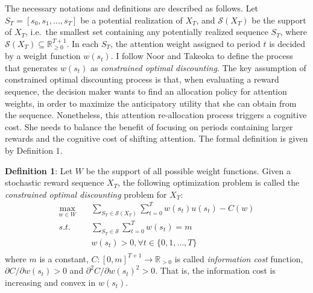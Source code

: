 \documentclass[
  12pt,
]{article}
\begin{document}
The necessary notations and definitions are described as follows. Let
\(S_T=[s_0,s_1,...,s_T]\) be a potential realization of \(X_T\), and
\(\mathcal{S}(X_T)\) be the support of \(X_T\), i.e.~the smallest set
containing any potentially realized sequence \(S_T\), where
\(\mathcal{S}(X_T)\subseteq \mathbb{R}_{\geq 0}^{T+1}\). In each
\(S_T\), the attention weight assigned to period \(t\) is decided by a
weight function \(w(s_t)\). I follow Noor and Takeoka
\citetext{\citeyear{noor_optimal_2022}; \citeyear{noor_constrained_2023}}
to define the process that generates \(w(s_t)\) as \emph{constrained
optimal discounting}. The key assumption of constrained optimal
discounting process is that, when evaluating a reward sequence, the
decision maker wants to find an allocation policy for attention weights,
in order to maximize the anticipatory utility that she can obtain from
the sequence. Nonetheless, this attention re-allocation process triggers
a cognitive cost. She needs to balance the benefit of focusing on
periods containing larger rewards and the cognitive cost of shifting
attention. The formal definition is given by Definition 1.

\textbf{Definition 1}: Let \(W\) be the support of all possible weight
functions. Given a stochastic reward sequence \(X_T\), the following
optimization problem is called the \emph{constrained optimal
discounting} problem for \(X_T\):\[ 
\begin{aligned}
\max_{w\in W}  \quad & \sum_{S_T\in \mathcal{S}(X_T)}\sum_{t=0}^T w(s_t)u(s_t) - C(w) \\
s.t. \quad &  \sum_{S_T\in \mathcal{S}}\sum_{t=0}^T w(s_t)=m \\
& w(s_t)> 0, \forall t\in\{0,1,…,T\} \\
\end{aligned}
\]where \(m\) is a constant,
\(C:[0,m]^{T+1}\rightarrow \mathbb{R}_{>0}\) is called \emph{information
cost} function, \(\partial C/\partial w(s_t)>0\) and
\(\partial^2 C/\partial w(s_t)^2>0\). That is, the information cost is
increasing and convex in \(w(s_t)\).
\end{document}
